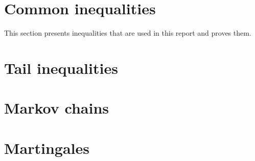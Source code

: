 \section{Common inequalities}
This section presents inequalities that are used in this report and proves them.
\begin{theorem}\label{bernoulli}

\end{theorem}
\begin{theorem}

\end{theorem}

\begin{theorem}\label{markov}

\end{theorem}
\begin{theorem}\label{cheby}

\end{theorem}

\section{Tail inequalities}
\begin{theorem}\label{chernoff}

\end{theorem}
\section{Markov chains}
\section{Martingales}